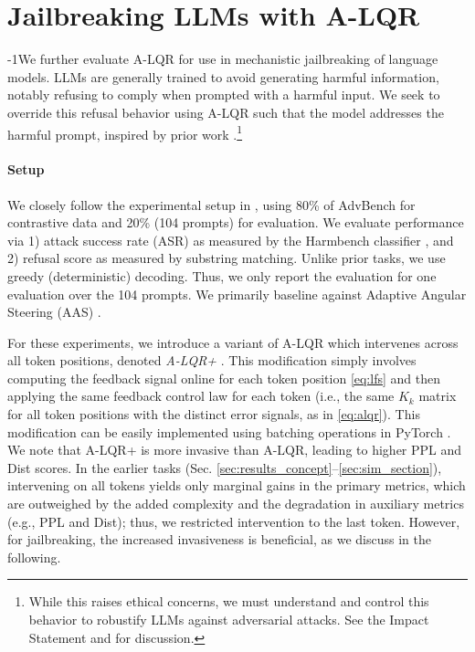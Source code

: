 \documentclass{article}
\theoremstyle{plain}
\theoremstyle{definition}
\theoremstyle{remark}
\begin{document}
\vspace{-9pt}
\section{Jailbreaking LLMs with A-LQR}\label{sec:jailbreaking}
\vspace{-2pt}

\looseness-1We further evaluate A-LQR for use in mechanistic jailbreaking of language models. LLMs are generally trained to avoid generating harmful information, notably refusing to comply when prompted with a harmful input. We seek to override this refusal behavior using A-LQR such that the model addresses the harmful prompt, inspired by prior work \cite{Arditi_Obeso_Syed_Paleka_Panickssery_Gurnee_Nanda_2024a,Nguyen_Vu_Pham_Zhang_Nguyen_2025,Vu_Nguyen_2025}.\footnote{While this raises ethical concerns, we must understand and control this behavior to robustify LLMs against adversarial attacks. See the Impact Statement and \citet{Arditi_Obeso_Syed_Paleka_Panickssery_Gurnee_Nanda_2024a} for discussion.} 

\vspace{-10pt}
\paragraph{Setup} We closely follow the experimental setup in \citet{Vu_Nguyen_2025}, using 80\% of AdvBench \cite{zou2023representation} for contrastive data and 20\% (104 prompts) for evaluation. We evaluate performance via 1) attack success rate (ASR) as measured by the Harmbench classifier \cite{mazeika2024harmbench}, and 2) refusal score as measured by substring matching. Unlike prior tasks, we use greedy (deterministic) decoding. Thus, we only report the evaluation for one evaluation over the 104 prompts. We primarily baseline against Adaptive Angular Steering (AAS) \cite{Vu_Nguyen_2025}.%

For these experiments, we introduce a variant of A-LQR which intervenes across all token positions, denoted \textit{A-LQR+}%
. This modification simply involves computing the feedback signal online for each token position \eqref{eq:lfs} and then applying the same feedback control law for each token (i.e., the same $K_k$ matrix for all token positions with the distinct error signals, as in \eqref{eq:alqr}). This modification can be easily implemented using batching operations in PyTorch \cite{paszke2019pytorch}. We note that A-LQR+ is more invasive than A-LQR, leading to higher PPL and Dist scores. In the earlier tasks (Sec. \ref{sec:results_concept}--\ref{sec:sim_section}), intervening on all tokens yields only marginal gains in the primary metrics, which are outweighed by the added complexity and the degradation in auxiliary metrics (e.g., PPL and Dist); thus, we restricted intervention to the last token. However, for jailbreaking, the increased invasiveness is beneficial, as we discuss in the following.
\end{document}
